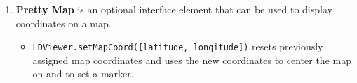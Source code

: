 \documentclass{article}
\begin{document}
\begin{enumerate}
\item \textbf{Pretty Map} is an optional interface element that can be used to display coordinates on a map.
\begin{itemize}
\item \texttt{LDViewer.setMapCoord([latitude, longitude])} resets previously assigned map coordinates and uses the new coordinates to center the map on and to set a marker.
\end{itemize}
\end{enumerate}
\end{document}
